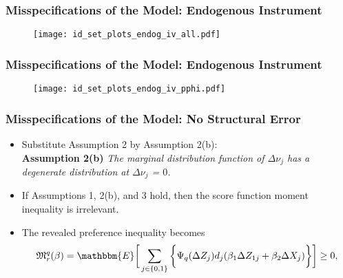 \begin{frame}
\frametitle{Misspecifications of the Model: Endogenous Instrument}

\begin{figure}[h!]
\centering \texttt{[image: id\_set\_plots\_endog\_iv\_all.pdf]}
\end{figure}

\end{frame}
\begin{frame}
\frametitle{Misspecifications of the Model: Endogenous Instrument}

\begin{figure}[h!]
\centering \texttt{[image: id\_set\_plots\_endog\_iv\_pphi.pdf]}
\end{figure}

\end{frame}
\begin{frame}
\frametitle{Misspecifications of the Model: No Structural Error}

\begin{itemize}
	\item Substitute Assumption 2 by Assumption 2(b):\\
	\bigskip
	\textbf{Assumption 2(b)} \textit{The marginal distribution function of $\Delta\nu_{j}$ has a degenerate distribution at $\Delta\nu_{j}$ = $0$.}
	\bigskip
	\item If Assumptions 1, 2(b), and 3 hold, then the score function moment inequality is irrelevant.
	\item The revealed preference inequality becomes
	\begin{align*}
	\mathfrak{M}^{q}_{r}(\beta)=\mathbbm{E}\bigg[\sum_{j\in\{0,1\}}\bigg\{\Psi_{q}(\Delta Z_{j})d_{j}(\beta_{1}\Delta Z_{1j}+\beta_{2}\Delta X_{j})\bigg\}\bigg]\geq 0,
	\end{align*}
\end{itemize}
\end{frame}

